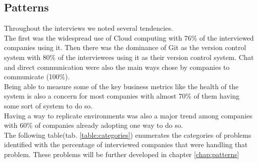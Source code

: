      \subsection{Patterns}
      Throughout the interviews we noted several tendencies. \\
      The first was the widespread use of Cloud computing with 76\% of the interviewed companies using it. Then there was the dominance of Git as the version control system with 80\% of the interviewees using it as their version control system. Chat and direct communication were also the main ways chose by companies to communicate (100\%). \\
      Being able to measure some of the key business metrics like the health of the system is also a concern for most companies with almost 70\% of them having some sort of system to do so. \\
      Having a way to replicate environments was also a major trend among companies with 60\% of companies already adopting one way to do so. \\
      The following table(tab. \ref{table:categories}) enumerates the categories of problems identified with the percentage of interviewed companies that were handling that problem. These problems will be further developed in chapter \ref{chap:patterns}

